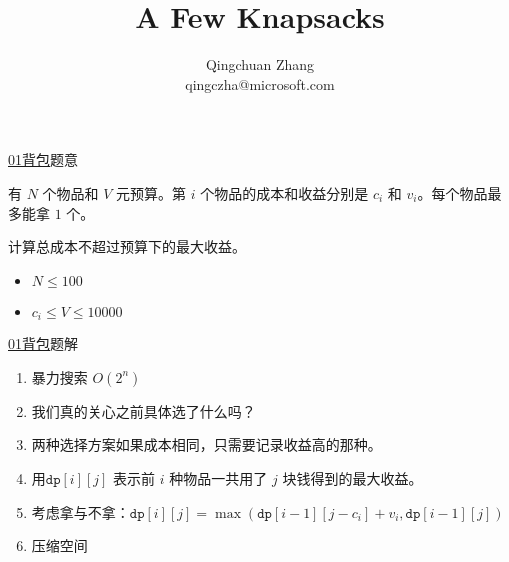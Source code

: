 \documentclass{beamer}
\title{A Few Knapsacks}
\author{Qingchuan Zhang\\ qingczha@microsoft.com}
\institute{Microsoft}
\begin{document}
\begin{frame}
\maketitle
\end{frame}


\begin{frame}{\href{https://vjudge.net/problem/51Nod-1085}{01背包}}{题意}

有 $N$ 个物品和 $V$ 元预算。第 $i$ 个物品的成本和收益分别是 $c_i$ 和 $v_i$。每个物品最多能拿 $1$ 个。

计算总成本不超过预算下的最大收益。



\begin{itemize}
    \item $ N \le 100$
    \item $ c_i\le V \le 10000$
\end{itemize}
\end{frame}
\begin{frame}{\href{https://vjudge.net/problem/51Nod-1085}{01背包}}{题解}

\begin{enumerate}
    \item 暴力搜索 $O(2^n)$ 
    \item 我们真的关心之前具体选了什么吗？
    \item 两种选择方案如果成本相同，只需要记录收益高的那种。
    \item 用$\texttt{dp}[i][j]$ 表示前 $i$ 种物品一共用了 $j$ 块钱得到的最大收益。
    \item 考虑拿与不拿：$\texttt{dp}[i][j] = \max(\texttt{dp}[i-1][j-c_i]+v_i,\texttt{dp}[i-1][j])$
    \item 压缩空间
\end{enumerate}


\end{frame}
\end{document}
